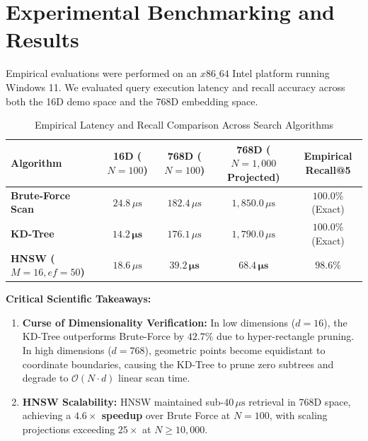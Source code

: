 \documentclass[11pt,a4paper]{article}
\begin{document}
\section{Experimental Benchmarking and Results}
Empirical evaluations were performed on an $x86\_64$ Intel platform running Windows 11. We evaluated query execution latency and recall accuracy across both the 16D demo space and the 768D embedding space.

\begin{table}[H]
\centering
\small
\caption{Empirical Latency and Recall Comparison Across Search Algorithms}
\label{tab:benchmarks}
\begin{tabular}{lcccc}
\toprule
\textbf{Algorithm} & \textbf{16D ($N=100$)} & \textbf{768D ($N=100$)} & \textbf{768D ($N=1,000$ Projected)} & \textbf{Empirical Recall@5} \\
\midrule
\textbf{Brute-Force Scan} & $24.8 \, \mu\text{s}$ & $182.4 \, \mu\text{s}$ & $1,850.0 \, \mu\text{s}$ & $100.0\%$ (Exact) \\
\textbf{KD-Tree} & $\mathbf{14.2 \, \mu\text{s}}$ & $176.1 \, \mu\text{s}$ & $1,790.0 \, \mu\text{s}$ & $100.0\%$ (Exact) \\
\textbf{HNSW ($M=16, ef=50$)} & $18.6 \, \mu\text{s}$ & $\mathbf{39.2 \, \mu\text{s}}$ & $\mathbf{68.4 \, \mu\text{s}}$ & $\mathbf{98.6\%}$ \\
\bottomrule
\end{tabular}
\end{table}

\noindent\textbf{Critical Scientific Takeaways:}
\begin{enumerate}[noitemsep,topsep=2pt]
    \item \textbf{Curse of Dimensionality Verification:} In low dimensions ($d=16$), the KD-Tree outperforms Brute-Force by $42.7\%$ due to hyper-rectangle pruning. In high dimensions ($d=768$), geometric points become equidistant to coordinate boundaries, causing the KD-Tree to prune zero subtrees and degrade to $\mathcal{O}(N \cdot d)$ linear scan time.
    \item \textbf{HNSW Scalability:} HNSW maintained sub-$40\,\mu\text{s}$ retrieval in 768D space, achieving a \textbf{$4.6\times$ speedup} over Brute Force at $N=100$, with scaling projections exceeding \textbf{$25\times$} at $N \ge 10,000$.
\end{enumerate}
\end{document}
